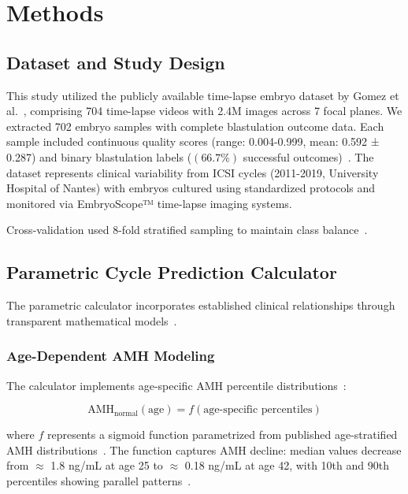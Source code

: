 \section{Methods}\label{sec:methods}

\subsection{Dataset and Study Design}\label{subsec:dataset}

This study utilized the publicly available time-lapse embryo dataset by Gomez et al.~\cite{gomez2022timelapse}, comprising 704 time-lapse videos with 2.4M images across 7 focal planes. We extracted 702 embryo samples with complete blastulation outcome data. Each sample included continuous quality scores (range: 0.004-0.999, mean: 0.592 ± 0.287) and binary blastulation labels ($(66.7\%)$ successful outcomes)~\cite{awadalla2021age,zhu2024developmental}. The dataset represents clinical variability from ICSI cycles (2011-2019, University Hospital of Nantes) with embryos cultured using standardized protocols and monitored via EmbryoScope™ time-lapse imaging systems.

Cross-validation used 8-fold stratified sampling to maintain class balance~\cite{hastie2009elements}.

\subsection{Parametric Cycle Prediction Calculator}\label{subsec:calculator}

The parametric calculator incorporates established clinical relationships through transparent mathematical models~\cite{rudin2019stop}.

\subsubsection{Age-Dependent AMH Modeling}

The calculator implements age-specific AMH percentile distributions~\cite{lee2017amh,song2021amh}:

\begin{equation}
\text{AMH}_{\text{normal}}(\text{age}) = f(\text{age-specific percentiles})
\end{equation}

where $f$ represents a sigmoid function parametrized from published age-stratified AMH distributions~\cite{lee2017amh}. The function captures AMH decline: median values decrease from $\approx$ 1.8 ng/mL at age 25 to $\approx$ 0.18 ng/mL at age 42, with 10th and 90th percentiles showing parallel patterns~\cite{lee2017amh}.

